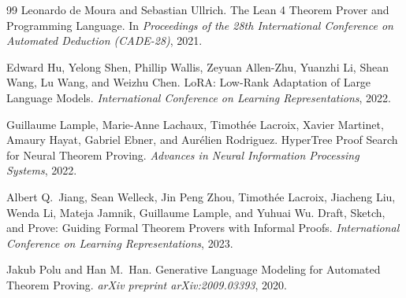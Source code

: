 \documentclass[openany, amssymb, psamsfonts]{amsart}
\theoremstyle{definition}
\numberwithin{equation}{section}
\begin{document}
\begin{thebibliography}{99}
Leonardo de Moura and Sebastian Ullrich.
The Lean 4 Theorem Prover and Programming Language.
In \textit{Proceedings of the 28th International Conference on Automated
Deduction (CADE-28)}, 2021.

Edward Hu, Yelong Shen, Phillip Wallis, Zeyuan Allen-Zhu, Yuanzhi Li,
Shean Wang, Lu Wang, and Weizhu Chen.
LoRA: Low-Rank Adaptation of Large Language Models.
\textit{International Conference on Learning Representations}, 2022.

Guillaume Lample, Marie-Anne Lachaux, Timoth\'{e}e Lacroix, Xavier Martinet,
Amaury Hayat, Gabriel Ebner, and Aur\'{e}lien Rodriguez.
HyperTree Proof Search for Neural Theorem Proving.
\textit{Advances in Neural Information Processing Systems}, 2022.

Albert Q.\ Jiang, Sean Welleck, Jin Peng Zhou, Timoth\'{e}e Lacroix,
Jiacheng Liu, Wenda Li, Mateja Jamnik, Guillaume Lample, and Yuhuai Wu.
Draft, Sketch, and Prove: Guiding Formal Theorem Provers with Informal Proofs.
\textit{International Conference on Learning Representations}, 2023.

Jakub Polu and Han M.\ Han.
Generative Language Modeling for Automated Theorem Proving.
\textit{arXiv preprint arXiv:2009.03393}, 2020.

\end{thebibliography}
\end{document}
